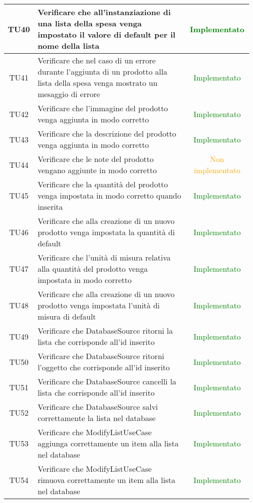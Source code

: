 \begin{center}
\begin{longtable}{|c|>{\centering}m{10cm}|c|}
		TU40 & Verificare che all'instanziazione di una lista della spesa venga impostato il valore di default per il nome della lista & \textcolor{Green}{Implementato}\\ \hline
		TU41 & Verificare che nel caso di un errore durante l'aggiunta di un prodotto alla lista della spesa venga mostrato un mesaggio di errore & \textcolor{Green}{Implementato}\\ \hline
		TU42 & Verificare che l'immagine del prodotto venga aggiunta in modo corretto & \textcolor{Green}{Implementato}\\ \hline
		TU43 & Verificare che la descrizione del prodotto venga aggiunta in modo corretto & \textcolor{Green}{Implementato}\\ \hline
		TU44 & Verificare che le note del prodotto vengano aggiunte in modo corretto & \textcolor{Orange}{Non implementato}\\ \hline
		TU45 & Verificare che la quantità del prodotto venga impostata in modo corretto quando inserita & \textcolor{Green}{Implementato}\\ \hline
		TU46 & Verificare che alla creazione di un nuovo prodotto venga impostata la quantità di default & \textcolor{Green}{Implementato}\\ \hline
		TU47 & Verificare che l'unità di misura relativa alla quantità del prodotto venga impostata in modo corretto & \textcolor{Green}{Implementato}\\ \hline
		TU48 & Verificare che alla creazione di un nuovo prodotto venga impostata l'unità di misura di default & \textcolor{Green}{Implementato}\\ \hline
		TU49 & Verificare che DatabaseSource ritorni la lista che corrisponde all'id inserito & \textcolor{Green}{Implementato}\\ \hline
		TU50 & Verificare che DatabaseSource ritorni l'oggetto che corrisponde all'id inserito & \textcolor{Green}{Implementato}\\ \hline
		TU51 & Verificare che DatabaseSource cancelli la lista che corrisponde all'id inserito & \textcolor{Green}{Implementato}\\ \hline
		TU52 & Verificare che DatabaseSource salvi correttamente la lista nel database & \textcolor{Green}{Implementato}\\ \hline
		TU53 & Verificare che ModifyListUseCase aggiunga correttamente un item alla lista nel database & \textcolor{Green}{Implementato}\\ \hline
		TU54 & Verificare che ModifyListUseCase rimuova correttamente un item alla lista nel database & \textcolor{Green}{Implementato}\\ \hline

\end{longtable}
\end{center}
